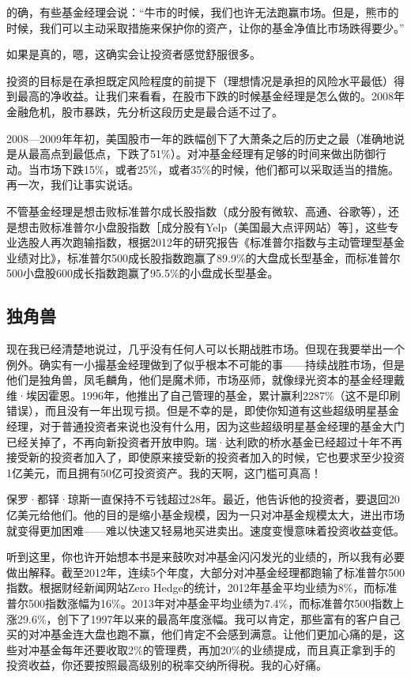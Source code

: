 的确，有些基金经理会说：“牛市的时候，我们也许无法跑赢市场。但是，熊市的时候，我们可以主动采取措施来保护你的资产，让你的基金净值比市场跌得要少。”

如果是真的，嗯，这确实会让投资者感觉舒服很多。

投资的目标是在承担既定风险程度的前提下（理想情况是承担的风险水平最低）得到最高的净收益。让我们来看看，在股市下跌的时候基金经理是怎么做的。2008年金融危机，股市暴跌，先分析这段历史是最合适不过了。

2008—2009年年初，美国股市一年的跌幅创下了大萧条之后的历史之最（准确地说是从最高点到最低点，下跌了51\%）。对冲基金经理有足够的时间来做出防御行动。当市场下跌15\%，或者25\%，或者35\%的时候，他们都可以采取适当的措施。再一次，我们让事实说话。

不管基金经理是想击败标准普尔成长股指数（成分股有微软、高通、谷歌等），还是想击败标准普尔小盘股指数［成分股有Yelp（美国最大点评网站）等］，这些专业选股人再次跑输指数，根据2012年的研究报告《标准普尔指数与主动管理型基金业绩对比》，标准普尔500成长股指数跑赢了89.9\%的大盘成长型基金，而标准普尔500小盘股600成长指数跑赢了95.5\%的小盘成长型基金。

\subsection{独角兽}

现在我已经清楚地说过，几乎没有任何人可以长期战胜市场。但现在我要举出一个例外。确实有一小撮基金经理做到了似乎根本不可能的事——持续战胜市场，但是他们是独角兽，凤毛麟角，他们是魔术师，市场巫师，就像绿光资本的基金经理戴维·埃因霍恩。1996年，他推出了自己管理的基金，累计赢利2287\%（这不是印刷错误），而且没有一年出现亏损。但是不幸的是，即使你知道有这些超级明星基金经理，对于普通投资者来说也没有什么用，因为这些超级明星基金经理的基金大门已经关掉了，不再向新投资者开放申购。瑞·达利欧的桥水基金已经超过十年不再接受新的投资者加入了，即使原来接受新的投资者加入的时候，它也要求至少投资1亿美元，而且拥有50亿可投资资产。我的天啊，这门槛可真高！

保罗·都铎·琼斯一直保持不亏钱超过28年。最近，他告诉他的投资者，要退回20亿美元给他们。他的目的是缩小基金规模，因为一只对冲基金规模太大，进出市场就变得更加困难——难以快速又轻易地买进卖出。速度变慢意味着投资收益变低。

听到这里，你也许开始想本书是来鼓吹对冲基金闪闪发光的业绩的，所以我有必要做出解释。截至2012年，连续5个年度，大部分对冲基金经理都跑输了标准普尔500指数。根据财经新闻网站Zero Hedge的统计，2012年基金平均业绩为8\%，而标准普尔500指数涨幅为16\%。2013年对冲基金平均业绩为7.4\%，而标准普尔500指数上涨29.6\%，创下了1997年以来的最高年度涨幅。我可以肯定，那些富有的客户自己买的对冲基金连大盘也跑不赢，他们肯定不会感到满意。让他们更加心痛的是，这些对冲基金每年还要收取2\%的管理费，再加20\%的业绩提成，而且真正拿到手的投资收益，你还要按照最高级别的税率交纳所得税。我的心好痛。

